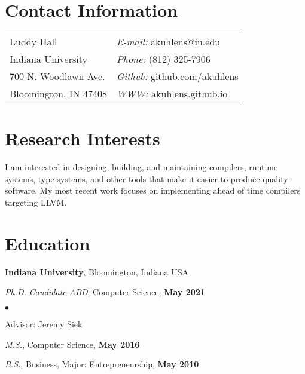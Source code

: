 \documentclass[resmargin,line]{res}
\newenvironment{list1}{
  \begin{list}{\ding{113}}{%
      \setlength{\itemsep}{0in}
      \setlength{\parsep}{0in} \setlength{\parskip}{0in}
      \setlength{\topsep}{0in} \setlength{\partopsep}{0in} 
      \setlength{\leftmargin}{0.17in}}}{\end{list}}
\newenvironment{list2}{
  \begin{list}{$\bullet$}{%
      \setlength{\itemsep}{0in}
      \setlength{\parsep}{0in} \setlength{\parskip}{0in}
      \setlength{\topsep}{0in} \setlength{\partopsep}{0in} 
      \setlength{\leftmargin}{0.2in}}}{\end{list}}
\begin{document}

\begin{resume}
\section{\sc Contact Information}
\vspace{.05in}
\begin{tabular}{@{}p{2in}p{4in}}
Luddy Hall                 & {\it E-mail:} akuhlens@iu.edu \\
Indiana University         & {\it Phone:}  (812) 325-7906 \\
700 N. Woodlawn Ave.       & {\it Github:} github.com/akuhlens  \\       
Bloomington, IN 47408      & {\it WWW:} akuhlens.github.io \\     
\end{tabular}

\section{\sc Research Interests}
I am interested in designing, building, and maintaining compilers,
runtime systems, type systems, and other tools that make it easier
to produce quality software. My most recent work focuses on
implementing ahead of time compilers targeting LLVM.

\section{\sc Education}
{\bf Indiana University},
Bloomington, Indiana USA\\
\vspace*{-.15in}
\begin{list1}
\item[] {\em Ph.D. Candidate ABD}, Computer Science, \hfill {\bf May 2021}\\
  \vspace*{-.15in}
  \begin{list2}
  \item[] Advisor:  Jeremy Siek
  \end{list2}
\item[] {\em M.S.}, Computer Science,  \hfill {\bf May 2016}
\item[] {\em B.S.}, Business, Major: Entrepreneurship, \hfill{} {\bf May 2010}
\end{list1}



\end{resume}
\end{document}
